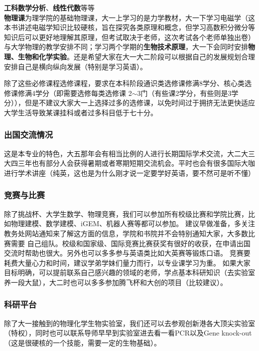 \documentclass[
decoration,  %
]{qyxf-book}
\begin{document}
\textbf{工科数学分析}、\textbf{线性代数}等等\\
\textbf{物理课}为理学院的基础物理课，大一上学习的是力学教材，大一下学习电磁学（这本书讲述电磁学知识比较硬核，旨在探究各类原理和概念，但学习高数积分微分等知识后可以更好地理解其原理，但考试取决于老师，这次考试各个老师单独出卷）与大学物理的教学安排不同；学习两个学期的\textbf{生物技术原理}，大一下会同时安排\textbf{物理、生物和化学实验}。还是希望大家在大一大二阶段可以根据自己的发展规划合理安排自己是横向纵向发展（特别是学习英语）。

除了这些必修课程选修课程，要求在本科阶段通识类选修课修满8学分、核心类选修课修满4学分（即需要选修每类选修课 2$\sim$3门（有些课2学分，有些则是3学分）），但是不建议大家大一上选择过多的选修课，以免时间过于拥挤无法更快适应大学生活导致某课挂科或者过多科目低于七十分。

\subsubsection{出国交流情况}

这是本专业的特色，大五那年会有相当比例的人进行长期国际学术交流，大二大三大四三年也有部分人会获得暑期或者寒期短期交流机会。平时也会有很多国际大咖进行学术讲座（纯英，这也是为什么刚才说一定要学好英语，要不然可是听不懂）

\subsubsection{竞赛与比赛}

除了挑战杯、大学生数学、物理竞赛，我们可以参加所有校级比赛和学院比赛，比如物理建模、数学建模、iGEM、机器人赛等都可以参加。 建议早做准备，多关注教务处网站通知来了解这方面的信息，学院和书院并不会特别通知大家，大多数比赛需要 自己组队。校级和国家级、国际竞赛比赛获奖有很好的收获，在申请出国交流时帮助也很大。另外也可以多多参与英语类比如大英赛等锻炼口语。 竞赛要耗费大量心力和时间，建议学弟学妹们量力而行，以专业课学习为重。 如果大家目标明确，可以提前联系自己感兴趣的领域的老师，学点基本科研知识（去实验室养一段大鼠），大二时也可以多多参加腾飞杯和大创的项目（比较建议）。

\subsubsection{科研平台}

除了大一接触到的物理化学生物实验室，我们还可以去参观创新港各大顶尖实验室（特权），同时也可以联系导师早早到实验室进去看一看PCR以及Gene knock-out（这是很硬核的一个技能，需要一定的生物基础）。
\end{document}
